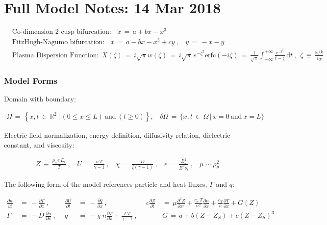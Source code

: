 \documentclass[a4paper,8pt]{article}
\date{}
\begin{document}
\section{Full Model Notes: 14 Mar
2018}\label{full-model-notes-14-mar-2018}

\small

\begin{align}
    &\text{Co-dimension 2 cusp bifurcation:} ~~~~ \dot{x} \,=\, a + bx - x^3 \\
    &\text{FitzHugh-Nagumo bifurcation:} ~~~~ \dot{x} \,=\, a - bx - x^3 + cy~,
        ~~~~ \dot{y} \,=\, -x - y \\
    &\text{Plasma Dispersion Function:} ~~ X(\zeta) \,=\, i \sqrt{\pi} w(\zeta)
        \,=\, i \sqrt{\pi} \, e^{-\zeta^2} \text{erfc}(-i \zeta)
        \,=\, \frac{1}{\sqrt{\pi}} \int_{-\infty}^{+\infty} \frac{e^{-t^2}}{t - \zeta} \, \text{d}t~,
        ~~ \zeta \,\equiv\, \frac{\omega/k}{v_T}
\end{align}

\normalsize

\subsubsection{Model Forms}\label{model-forms}

Domain with boundary: \small

\begin{align}
    \Omega \,=\, \left\{x, t \,\in\, \mathbb{R}^2 \,|\, (0 \leq x \leq L) ~\text{and}~ (t \geq 0)\right\}, ~~~~ \delta\Omega \,=\, \{x, t \,\in\, \Omega \,|\, x = 0 ~\text{and}~ x = L \}
\end{align}

\normalsize

Electric field normalization, energy definition, diffusivity relation,
dielectric constant, and viscosity: \small

\begin{align}
    Z \,\equiv\, \frac{\rho_\theta \, e \, E_r}{T}~, ~~~~ U \,=\, \frac{n\,T}{\gamma - 1}~, ~~~~ \chi \,=\, \frac{D}{\zeta(\gamma - 1)}~, ~~~~ \epsilon \,=\, \frac{B_\theta^2}{B^2 \nu_i}~, ~~~~ \mu \sim \rho_\theta^2
\end{align}

\normalsize

The following form of the model references particle and heat fluxes,
\(\Gamma\) and \(q\): \small

\begin{align}
    \frac{\partial n}{\partial t} \,&=\, -\frac{\partial \Gamma}{\partial x}~,~~&
    \frac{\partial U}{\partial t} \,&=\, -\frac{\partial q}{\partial x}~,~~&
    \epsilon \frac{\partial Z}{\partial t} \,&=\, \mu \frac{\partial^2 Z}{\partial x^2} + \frac{c_n \, T}{n^2} \frac{\partial n}{\partial x} + \frac{c_T}{n} \frac{\partial T}{\partial x} + G(Z) \\
    \Gamma \,&=\, -D \, \frac{\partial n}{\partial x}~,~~&
    q \,&=\, -\chi \, n \frac{\partial T}{\partial x} + \frac{\Gamma\,T}{\gamma - 1}~,~~&
    &G \,=\, a + b(Z - Z_S) + c(Z - Z_S)^3
\end{align}
\end{document}
